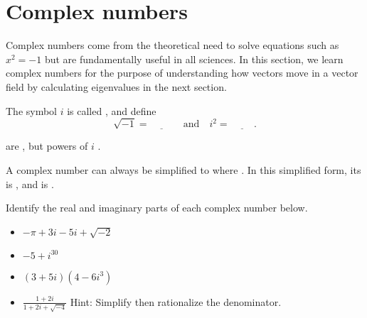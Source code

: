 \documentclass[../main.tex]{subfiles}
\begin{document}
 \section{Complex numbers}

Complex numbers come from the theoretical need to solve equations such as \(x^{2} = -1\) but are fundamentally useful in all sciences.  In this section, we learn complex numbers for the purpose of understanding how vectors move in a vector field by calculating eigenvalues in the next section.

\begin{definition}
  The symbol \(i\) is called , and define
  \[
    \sqrt{-1} = \underline{\hspace{1cm}}
    \quad\text{and}\quad 
    i^{2} = \underline{\hspace{1cm}}.
  \]

   are , but powers of \(i\) .

  A complex number can always be simplified to \underline{\hspace{2cm}} where \underline{\hspace{1.5in}}. In this simplified form, its  is \underline{\hspace{1cm}}, and  is \underline{\hspace{1cm}}.
\end{definition}


\begin{example}
  Identify the real and imaginary parts of each complex number below. 

  \begin{itemize}[wide]
    \item \(-\pi + 3i - 5i + \sqrt{-2}\)

    \item \(-5 + i^{30} \)

    \item \((3 + 5i) (4 - 6i^{3})\)

    \item \(\frac{1 + 2i}{1 + 2i + \sqrt{-4}}\) \quad Hint: Simplify then rationalize the denominator.
  \end{itemize}
\end{example}
\clearpage
\end{document}
